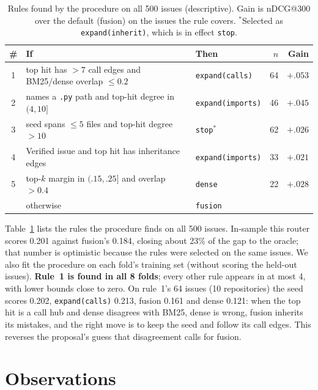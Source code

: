 \documentclass[11pt]{article}
\newcommand{\action}[1]{\texttt{#1}}
\begin{document}
\begin{table}[t]
\centering
\small
\begin{tabularx}{\textwidth}{@{}c X l r r@{}}
\toprule
\# & If & Then & $n$ & Gain \\
\midrule
1 & top hit has $>7$ call edges and BM25/dense overlap $\leq 0.2$ & \action{expand(calls)} & 64 & $+.053$ \\
2 & names a \texttt{.py} path and top-hit degree in $(4, 10]$ & \action{expand(imports)} & 46 & $+.045$ \\
3 & seed spans $\leq 5$ files and top-hit degree $>10$ & \action{stop}$^\ast$ & 62 & $+.026$ \\
4 & Verified issue and top hit has inheritance edges & \action{expand(imports)} & 33 & $+.021$ \\
5 & top-$k$ margin in $(.15,.25]$ and overlap $>0.4$ & \action{dense} & 22 & $+.028$ \\
\midrule
 & otherwise & \action{fusion} & & \\
\bottomrule
\end{tabularx}
\caption{Rules found by the procedure on all 500 issues (descriptive). Gain
is nDCG@300 over the default (fusion) on the issues the rule covers.
$^\ast$Selected as \action{expand(inherit)}, which is in effect \action{stop}.}
\label{tab:rules}
\end{table}

Table~\ref{tab:rules} lists the rules the procedure finds on all 500 issues.
In-sample this router scores 0.201 against fusion's 0.184, closing about 23\%
of the gap to the oracle; that number is optimistic because the rules were
selected on the same issues. We also fit the procedure on each fold's training
set (without scoring the held-out issues). \textbf{Rule~1 is found in all 8
folds}; every other rule appears in at most 4, with lower bounds close to
zero. On rule~1's 64 issues (10 repositories) the seed scores 0.202,
\action{expand(calls)} 0.213, fusion 0.161 and dense 0.121: when the top hit
is a call hub and dense disagrees with BM25, dense is wrong, fusion inherits
its mistakes, and the right move is to keep the seed and follow its call
edges. This reverses the proposal's guess that disagreement calls for fusion.

\section{Observations}
\label{sec:obs}
\end{document}
